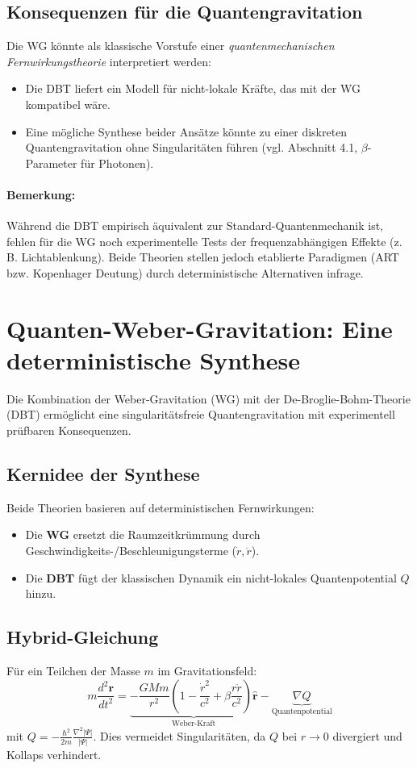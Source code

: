 \subsection{Konsequenzen für die Quantengravitation}
Die WG könnte als klassische Vorstufe einer \textit{quantenmechanischen Fernwirkungstheorie} interpretiert werden:
\begin{itemize}
    \item Die DBT liefert ein Modell für nicht-lokale Kräfte, das mit der WG kompatibel wäre.
    \item Eine mögliche Synthese beider Ansätze könnte zu einer diskreten Quantengravitation ohne Singularitäten führen (vgl. Abschnitt 4.1, $\beta$-Parameter für Photonen).
\end{itemize}

\paragraph*{Bemerkung:} Während die DBT empirisch äquivalent zur Standard-Quantenmechanik ist, fehlen für die WG noch experimentelle Tests der frequenzabhängigen Effekte (z. B. Lichtablenkung). Beide Theorien stellen jedoch etablierte Paradigmen (ART bzw. Kopenhager Deutung) durch deterministische Alternativen infrage.

\section{Quanten-Weber-Gravitation: Eine deterministische Synthese}
Die Kombination der Weber-Gravitation (WG) mit der De-Broglie-Bohm-Theorie (DBT) ermöglicht eine singularitätsfreie Quantengravitation mit experimentell prüfbaren Konsequenzen.

\subsection{Kernidee der Synthese}
Beide Theorien basieren auf deterministischen Fernwirkungen:
\begin{itemize}
    \item Die \textbf{WG} ersetzt die Raumzeitkrümmung durch Geschwindigkeits-/Beschleunigungsterme ($\dot{r}, \ddot{r}$).
    \item Die \textbf{DBT} fügt der klassischen Dynamik ein nicht-lokales Quantenpotential $Q$ hinzu.
\end{itemize}

\subsection{Hybrid-Gleichung}
Für ein Teilchen der Masse $m$ im Gravitationsfeld:
\begin{equation}
    m\frac{d^2\mathbf{r}}{dt^2} = \underbrace{-\frac{GMm}{r^2}\left(1-\frac{\dot{r}^2}{c^2}+\beta\frac{r\ddot{r}}{c^2}\right)\hat{\mathbf{r}}}_{\text{Weber-Kraft}} - \underbrace{\nabla Q}_{\text{Quantenpotential}}
\end{equation}
mit $Q = -\frac{\hbar^2}{2m}\frac{\nabla^2|\Psi|}{|\Psi|}$. Dies vermeidet Singularitäten, da $Q$ bei $r \to 0$ divergiert und Kollaps verhindert.

